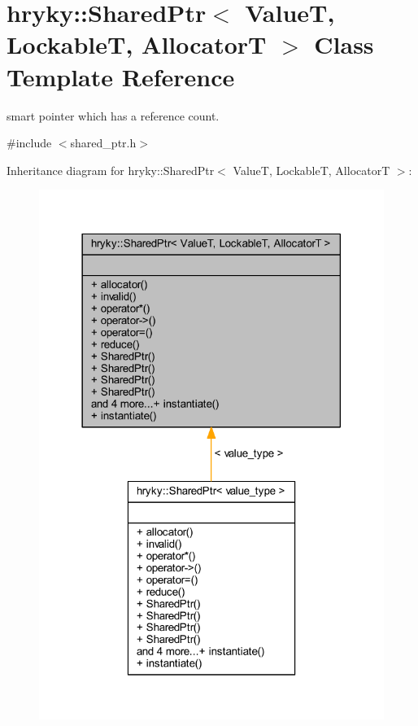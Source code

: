 \hypertarget{classhryky_1_1_shared_ptr}{\section{hryky\-:\-:Shared\-Ptr$<$ Value\-T, Lockable\-T, Allocator\-T $>$ Class Template Reference}
\label{classhryky_1_1_shared_ptr}
}


smart pointer which has a reference count.  




{\ttfamily \#include $<$shared\-\_\-ptr.\-h$>$}



Inheritance diagram for hryky\-:\-:Shared\-Ptr$<$ Value\-T, Lockable\-T, Allocator\-T $>$\-:
\nopagebreak
\begin{figure}[H]
\begin{center}
\leavevmode
\includegraphics[width=318pt]{classhryky_1_1_shared_ptr__inherit__graph}
\end{center}
\end{figure}

